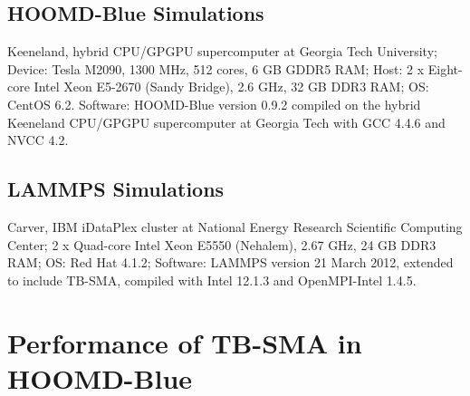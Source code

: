 \documentclass[10pt]{report}  %
\newcommand\findent{\hspace*{\parindent}}
\begin{document}
\subsection{HOOMD-Blue Simulations}

\findent Keeneland, hybrid CPU/GPGPU supercomputer at Georgia Tech University; Device: Tesla M2090, 1300 MHz, 512 cores, 6 GB GDDR5 RAM; Host: 2 x Eight-core Intel Xeon E5-2670 (Sandy Bridge), 2.6 GHz, 32 GB DDR3 RAM; OS: CentOS 6.2. Software: HOOMD-Blue version 0.9.2 compiled on the hybrid Keeneland CPU/GPGPU supercomputer at Georgia Tech with GCC 4.4.6 and NVCC 4.2.

\subsection{LAMMPS Simulations}

\findent Carver, IBM iDataPlex cluster at National Energy Research Scientific Computing Center; 2 x Quad-core Intel Xeon E5550 (Nehalem), 2.67 GHz, 24 GB DDR3 RAM; OS: Red Hat 4.1.2; Software: LAMMPS version 21 March 2012, extended to include TB-SMA, compiled with Intel 12.1.3 and OpenMPI-Intel 1.4.5.


\section{Performance of TB-SMA in HOOMD-Blue}
\end{document}
